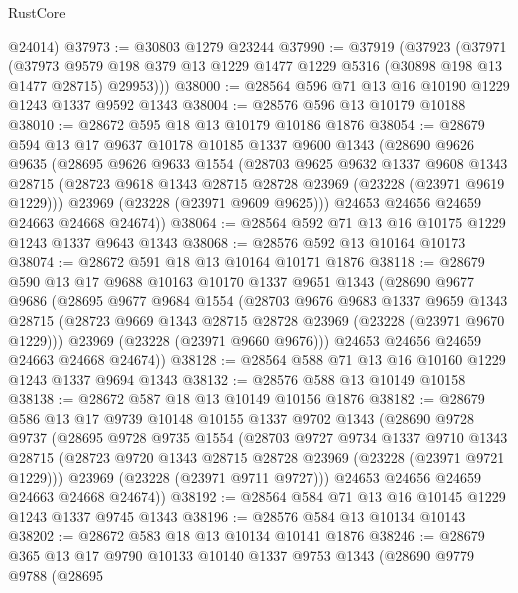 \begin{lexlean}{RustCore}
\begin{coremodule}
      @24014)
@37973 := @30803 @1279 @23244
@37990 := @37919
    (@37923
      (@37971
        (@37973 @9579 @198 @379 @13 @1229 @1477 @1229 @5316 (@30898 @198 @13 @1477 @28715) @29953)))
@38000 := @28564 @596 @71 @13 @16 @10190 @1229 @1243 @1337 @9592 @1343
@38004 := @28576 @596 @13 @10179 @10188
@38010 := @28672 @595 @18 @13 @10179 @10186 @1876
@38054 := @28679
    @594
    @13
    @17
    @9637
    @10178
    @10185
    @1337
    @9600
    @1343
    (@28690
      @9626
      @9635
      (@28695
        @9626
        @9633
        @1554
        (@28703
          @9625
          @9632
          @1337
          @9608
          @1343
          @28715
          (@28723 @9618 @1343 @28715 @28728 @23969 (@23228 (@23971 @9619 @1229)))
          @23969
          (@23228 (@23971 @9609 @9625)))
        @24653
        @24656
        @24659
        @24663
        @24668
        @24674))
@38064 := @28564 @592 @71 @13 @16 @10175 @1229 @1243 @1337 @9643 @1343
@38068 := @28576 @592 @13 @10164 @10173
@38074 := @28672 @591 @18 @13 @10164 @10171 @1876
@38118 := @28679
    @590
    @13
    @17
    @9688
    @10163
    @10170
    @1337
    @9651
    @1343
    (@28690
      @9677
      @9686
      (@28695
        @9677
        @9684
        @1554
        (@28703
          @9676
          @9683
          @1337
          @9659
          @1343
          @28715
          (@28723 @9669 @1343 @28715 @28728 @23969 (@23228 (@23971 @9670 @1229)))
          @23969
          (@23228 (@23971 @9660 @9676)))
        @24653
        @24656
        @24659
        @24663
        @24668
        @24674))
@38128 := @28564 @588 @71 @13 @16 @10160 @1229 @1243 @1337 @9694 @1343
@38132 := @28576 @588 @13 @10149 @10158
@38138 := @28672 @587 @18 @13 @10149 @10156 @1876
@38182 := @28679
    @586
    @13
    @17
    @9739
    @10148
    @10155
    @1337
    @9702
    @1343
    (@28690
      @9728
      @9737
      (@28695
        @9728
        @9735
        @1554
        (@28703
          @9727
          @9734
          @1337
          @9710
          @1343
          @28715
          (@28723 @9720 @1343 @28715 @28728 @23969 (@23228 (@23971 @9721 @1229)))
          @23969
          (@23228 (@23971 @9711 @9727)))
        @24653
        @24656
        @24659
        @24663
        @24668
        @24674))
@38192 := @28564 @584 @71 @13 @16 @10145 @1229 @1243 @1337 @9745 @1343
@38196 := @28576 @584 @13 @10134 @10143
@38202 := @28672 @583 @18 @13 @10134 @10141 @1876
@38246 := @28679
    @365
    @13
    @17
    @9790
    @10133
    @10140
    @1337
    @9753
    @1343
    (@28690
      @9779
      @9788
      (@28695

\end{coremodule}
\end{lexlean}
